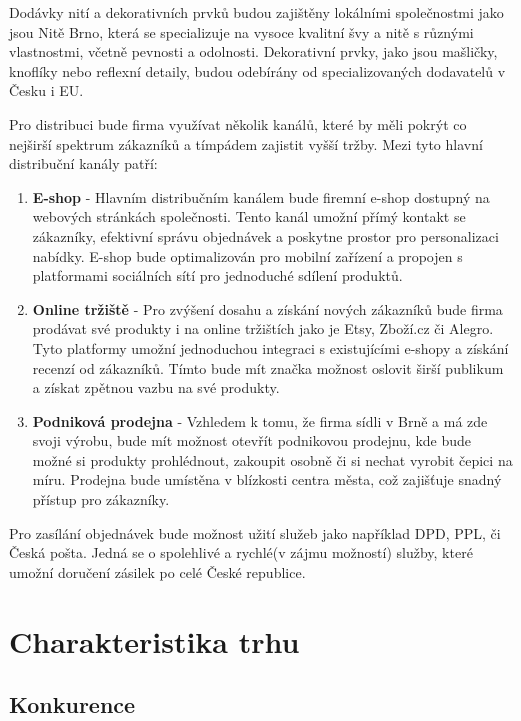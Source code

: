 \documentclass[12pt, a4paper]{article}
\begin{document}
Dodávky nití a dekorativních prvků budou zajištěny lokálními společnostmi
jako jsou Nitě Brno, která se specializuje na vysoce kvalitní švy a nitě s různými vlastnostmi, včetně pevnosti a odolnosti.
Dekorativní prvky, jako jsou mašličky, knoflíky nebo reflexní detaily, budou odebírány od specializovaných dodavatelů v Česku i EU.

\vspace{20pt}
\noindent Pro distribuci bude firma využívat několik kanálů, které by měli pokrýt co nejširší spektrum zákazníků a tímpádem
zajistit vyšší tržby. Mezi tyto hlavní distribuční kanály patří:

\begin{enumerate}
  \item \textbf{E-shop} -
  Hlavním distribučním kanálem bude firemní e-shop dostupný na webových stránkách společnosti. 
  Tento kanál umožní přímý kontakt se zákazníky, efektivní správu objednávek a poskytne prostor pro personalizaci nabídky. 
  E-shop bude optimalizován pro mobilní zařízení a propojen s platformami sociálních sítí pro jednoduché sdílení produktů.
  \item \textbf{Online tržiště} -
  Pro zvýšení dosahu a získání nových zákazníků bude firma prodávat své produkty i na online tržištích jako je Etsy, Zboží.cz či Alegro.
  Tyto platformy umožní jednoduchou integraci s existujícími e-shopy a získání recenzí od zákazníků.
  Tímto bude mít značka možnost oslovit širší publikum a získat zpětnou vazbu na své produkty.
  \item \textbf{Podniková prodejna} -
  Vzhledem k tomu, že firma sídli v Brně a má zde svoji výrobu, bude mít možnost otevřít podnikovou prodejnu, kde bude možné si produkty prohlédnout, zakoupit osobně
  či si nechat vyrobit čepici na míru. Prodejna bude umístěna v blízkosti centra města, což zajišťuje snadný přístup pro zákazníky.
\end{enumerate}

Pro zasílání objednávek bude možnost užití služeb jako například DPD, PPL, či Česká pošta.
Jedná se o spolehlivé a rychlé(v zájmu možností) služby, které umožní doručení zásilek po celé České republice.

\pagebreak

\section{Charakteristika trhu}
\subsection{Konkurence}
\end{document}
